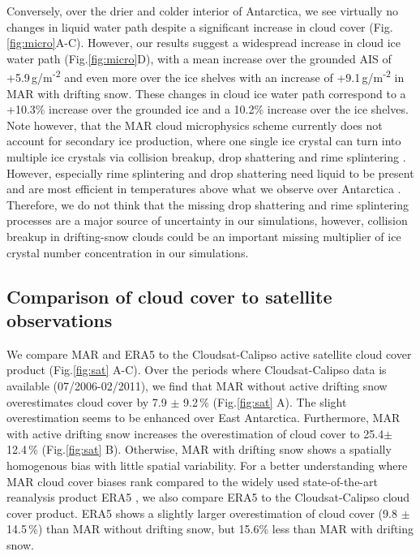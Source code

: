 \documentclass[draft]{agujournal2019}
\begin{document}
 Conversely, over the drier and colder interior of Antarctica, we see virtually no changes in liquid water path despite a significant increase in cloud cover (Fig.\ref{fig:micro}A-C). However, our results suggest a widespread increase in cloud ice water path (Fig.\ref{fig:micro}D), with a mean increase over the grounded AIS of +5.9\,g/m\textsuperscript{-2} and even more over the ice shelves with an increase of +9.1\,g/m\textsuperscript{-2} in MAR with drifting snow. These changes in cloud ice water path correspond to a +10.3\% increase over the grounded ice and a 10.2\% increase over the ice shelves.  %
 Note however, that the MAR cloud microphysics scheme currently does not account for secondary ice production, where one single ice crystal can turn into multiple ice crystals via collision breakup, drop shattering and rime splintering \cite{Gallee1994, Storelvmo2015, Soti2020, Field2017}. However, especially rime splintering and drop shattering need liquid to be present and are most efficient in temperatures above what we observe over Antarctica \cite{Soti2020}. Therefore, we do not think that the missing drop shattering and rime splintering processes are a major source of uncertainty in our simulations, however, collision breakup in drifting-snow clouds could be an important missing multiplier of ice crystal number concentration in our simulations.

\subsection{Comparison of cloud cover to satellite observations}


We compare MAR and ERA5 to the Cloudsat-Calipso active satellite cloud cover product \cite{kay2009, marchand2008, mace2009} (Fig.\ref{fig:sat} A-C). Over the periods where Cloudsat-Calipso data is available (07/2006-02/2011), we find that MAR without active drifting snow overestimates cloud cover by 7.9 $\pm$ 9.2\,\% (Fig.\ref{fig:sat} A). The slight overestimation seems to be enhanced over East Antarctica. Furthermore, MAR with active drifting snow increases the overestimation of cloud cover to 25.4$\pm$ 12.4\,\% (Fig.\ref{fig:sat} B). Otherwise, MAR with drifting snow shows a spatially homogenous bias with little spatial variability. For a better understanding where MAR cloud cover biases rank compared to the widely used state-of-the-art reanalysis product ERA5 \cite{Hersbach2020}, we also compare ERA5 to the Cloudsat-Calipso cloud cover product. ERA5 shows a slightly larger overestimation of cloud cover (9.8 $\pm$ 14.5\,\%) than MAR without drifting snow, but 15.6\% less than MAR with drifting snow.
\end{document}
